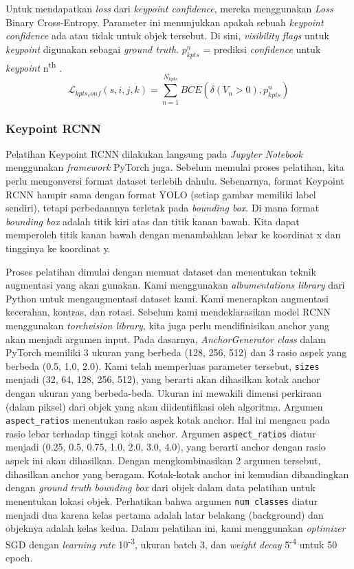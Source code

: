 Untuk mendapatkan \textit{loss} dari \textit{keypoint confidence}, mereka menggunakan \textit{Loss} Binary Cross-Entropy. Parameter ini menunjukkan apakah sebuah \textit{keypoint confidence} ada atau tidak untuk objek tersebut. Di sini, \textit{visibility flags} untuk \textit{keypoint} digunakan sebagai \textit{ground truth}.
$p_{kpts}^n$ = prediksi \textit{confidence} untuk \textit{keypoint} n\textsuperscript{th} \parencite{maji2022yolopose}.
\begin{equation}
  \label{eq:keypoint-confident-loss-yolo}
  \mathcal{L}_{kpts_conf}(s,i,j,k) = \sum_{n=1}^{N_{kpts}} BCE(\delta(V_n > 0), p_{kpts}^n)
\end{equation}

\subsubsection{Keypoint RCNN}
\label{subsubsec:training-rcnn}

Pelatihan Keypoint RCNN dilakukan langsung pada \textit{Jupyter Notebook} menggunakan \textit{framework} PyTorch juga.
Sebelum memulai proses pelatihan, kita perlu mengonversi format dataset terlebih dahulu.
Sebenarnya, format Keypoint RCNN hampir sama dengan format YOLO (setiap gambar memiliki label sendiri), tetapi perbedaannya terletak pada \textit{bounding box}.
Di mana format \textit{bounding box} adalah titik kiri atas dan titik kanan bawah. Kita dapat memperoleh titik kanan bawah dengan menambahkan lebar ke koordinat x dan tingginya ke koordinat y.

Proses pelatihan dimulai dengan memuat dataset dan menentukan teknik augmentasi yang akan gunakan. Kami menggunakan \emph{albumentations library} dari Python untuk mengaugmentasi dataset kami.
Kami menerapkan augmentasi kecerahan, kontras, dan rotasi.
Sebelum kami mendeklarasikan model RCNN menggunakan \textit{torchvision library}, kita juga perlu mendifinisikan anchor yang akan menjadi argumen input.
Pada dasarnya, \emph{AnchorGenerator class} dalam PyTorch memiliki 3 ukuran yang berbeda (128, 256, 512) dan 3 rasio aspek yang berbeda (0.5, 1.0, 2.0).
Kami telah memperluas parameter tersebut, \verb|sizes| menjadi (32, 64, 128, 256, 512), yang berarti akan dihasilkan kotak anchor dengan ukuran yang berbeda-beda. Ukuran ini mewakili dimensi perkiraan (dalam piksel) dari objek yang akan diidentifikasi oleh algoritma.
Argumen \verb|aspect_ratios| menentukan rasio aspek kotak anchor. Hal ini mengacu pada rasio lebar terhadap tinggi kotak anchor.
Argumen \verb|aspect_ratios| diatur menjadi (0.25, 0.5, 0.75, 1.0, 2.0, 3.0, 4.0), yang berarti anchor dengan rasio aspek ini akan dihasilkan. Dengan mengkombinasikan 2 argumen tersebut, dihasilkan anchor yang beragam.
Kotak-kotak anchor ini kemudian dibandingkan dengan \textit{ground truth bounding box} dari objek dalam data pelatihan untuk menentukan lokasi objek.
Perhatikan bahwa argumen \verb|num classes| diatur menjadi dua karena kelas pertama adalah latar belakang (background) dan objeknya adalah kelas kedua.
Dalam pelatihan ini, kami menggunakan \textit{optimizer} SGD dengan \textit{learning rate} 10\textsuperscript{-3}, ukuran batch 3, dan \textit{weight decay} 5\textsuperscript{-4} untuk 50 epoch.

